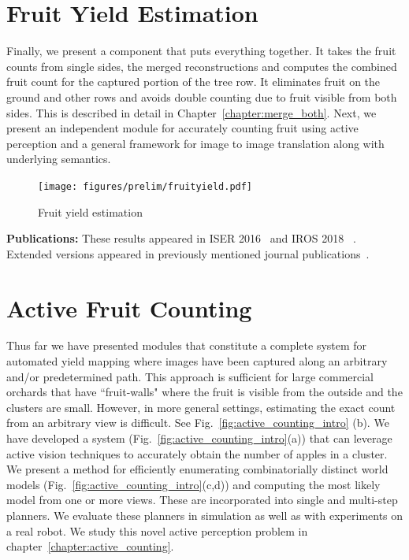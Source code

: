 \section{Fruit Yield Estimation}\label{sec:fruityield}
Finally, we present a component that puts everything together. It takes the fruit counts from single sides, the merged reconstructions and computes the combined fruit count for the captured portion of the tree row. It eliminates fruit on the ground and other rows and avoids double counting due to fruit visible from both sides. This is described in detail in Chapter~\ref{chapter:merge_both}. Next, we present an independent module for accurately counting fruit using active perception and a general framework for image to image translation along with underlying semantics. \\
\begin{figure}[!hbpt]
    \centering
    \texttt{[image: figures/prelim/fruityield.pdf]}
    \caption[Fruit yield estimation.]{ Fruit yield estimation}
    \label{fig:fruit_yield_full}
\end{figure}
\textbf{Publications:} These results appeared in ISER 2016~\cite{roy2016counting} and IROS 2018 ~\cite{roy_registering_2018}. Extended versions appeared in previously mentioned journal publications~\cite{roy2018arxiv,dong2018semantic,hani_jfr_counting}.

\section{Active Fruit Counting}\label{sec:activecounting} Thus far we have presented modules that constitute a complete system for automated yield mapping where images have been captured along an arbitrary and/or predetermined path. This approach is sufficient for large commercial orchards that have ``fruit-walls" where the fruit is visible from the outside and the clusters are small. However, in more general settings, estimating the exact count from an arbitrary view is difficult. See Fig.~\ref{fig:active_counting_intro} (b). We have developed a system (Fig.~\ref{fig:active_counting_intro}(a)) that can leverage active vision techniques to accurately obtain the number of apples in a cluster. We present a method for efficiently enumerating combinatorially distinct world models (Fig.~\ref{fig:active_counting_intro}(c,d)) and computing the most likely model from one or more views. These are incorporated into single and multi-step planners. We evaluate these planners in simulation as well as with experiments on a real robot. We study this novel active perception problem in chapter~\ref{chapter:active_counting}.\\

